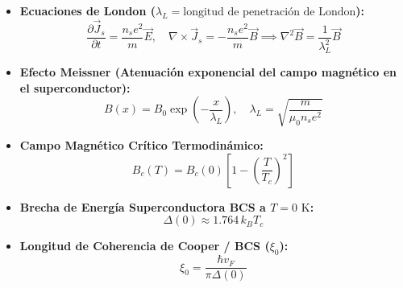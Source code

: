 \documentclass[11pt,a4paper]{article}
\begin{document}
\begin{itemize}
  \item \textbf{Ecuaciones de London ($\lambda_L = \text{longitud de penetración de London}$):}
  \[
    \frac{\partial \vec{J}_s}{\partial t} = \frac{n_s e^2}{m} \vec{E}, \quad \nabla \times \vec{J}_s = -\frac{n_s e^2}{m}\vec{B} \implies \nabla^2\vec{B} = \frac{1}{\lambda_L^2}\vec{B}
  \]
  \item \textbf{Efecto Meissner (Atenuación exponencial del campo magnético en el superconductor):}
  \[
    B(x) = B_0 \exp\left( -\frac{x}{\lambda_L} \right), \quad \lambda_L = \sqrt{\frac{m}{\mu_0 n_s e^2}}
  \]
  \item \textbf{Campo Magnético Crítico Termodinámico:}
  \[
    B_c(T) = B_c(0)\left[ 1 - \left( \frac{T}{T_c} \right)^2 \right]
  \]
  \item \textbf{Brecha de Energía Superconductora BCS a $T = 0\text{ K}$:}
  \[
    \Delta(0) \approx 1.764 \, k_B T_c
  \]
  \item \textbf{Longitud de Coherencia de Cooper / BCS ($\xi_0$):}
  \[
    \xi_0 = \frac{\hbar v_F}{\pi \Delta(0)}
  \]
\end{itemize}
\end{document}
